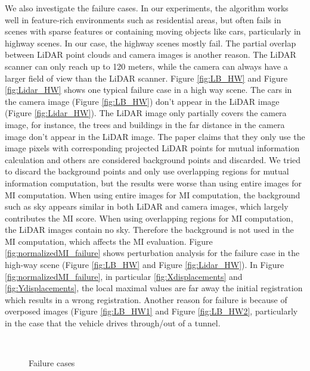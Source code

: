 We also investigate the failure cases. In our experiments, the algorithm works well in feature-rich environments such as residential areas, but often fails in scenes with sparse features or containing moving objects like cars, particularly in highway scenes. In our case, the highway scenes mostly fail. The partial overlap between LiDAR point clouds and camera images is another reason. The LiDAR scanner can only reach up to 120 meters, while the camera can always have a larger field of view than the LiDAR scanner. Figure \ref{fig:LB_HW} and Figure \ref{fig:Lidar_HW} shows one typical failure case in a high way scene. The cars in the camera image (Figure \ref{fig:LB_HW}) don't appear in the LiDAR image (Figure \ref{fig:Lidar_HW}). The LiDAR image only partially covers the camera image, for instance, the trees and buildings in the far distance in the camera image don't appear in the LiDAR image. The paper \cite{MastinFisher09} claims that they only use the image pixels with corresponding projected LiDAR points for mutual information calculation and others are considered background points and discarded. We tried to discard the background points and only use overlapping regions for mutual information computation, but the results were worse than using entire images for MI computation. When using entire images for MI
computation, the background such as sky appears similar in both LiDAR and camera images, which largely contributes the MI score. 
When using overlapping regions for MI computation, the LiDAR images contain no sky. Therefore the background is not used in the MI computation, which affects the MI evaluation. Figure \ref{fig:normalizedMI_failure} shows perturbation analysis for the failure case in the high-way scene (Figure \ref{fig:LB_HW} and Figure \ref{fig:Lidar_HW}). In Figure \ref{fig:normalizedMI_failure}, in particular  \ref{fig:Xdisplacements} and \ref{fig:Ydisplacements}, the local maximal values are far away the initial registration which results in a wrong registration.
Another reason for failure is because of overposed images (Figure \ref{fig:LB_HW1} and Figure \ref{fig:LB_HW2}, particularly in the case that the vehicle drives through/out of a tunnel.

\begin{figure}[H]
\centering
{} 
\hspace{.1in}
 \\ 
\hspace{.1in}
\caption{Failure cases} 
\label{fig:Fcases}
\end{figure}

